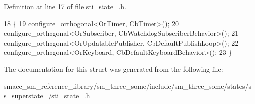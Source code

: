 Definition at line 17 of file sti\+\_\+state\+\_.\+h.


\begin{DoxyCode}
18   \{
19     configure\_orthogonal<OrTimer, CbTimer>();
20     configure\_orthogonal<OrSubscriber, CbWatchdogSubscriberBehavior>();
21     configure\_orthogonal<OrUpdatablePublisher, CbDefaultPublishLoop>();
22     configure\_orthogonal<OrKeyboard, CbDefaultKeyboardBehavior>();
23   \}
\end{DoxyCode}


The documentation for this struct was generated from the following file\+:\begin{DoxyCompactItemize}
\item 
smacc\+\_\+sm\+\_\+reference\+\_\+library/sm\+\_\+three\+\_\+some/include/sm\+\_\+three\+\_\+some/states/ss\+\_\+superstate\+\_/\hyperlink{sti__state__2_8h}{sti\+\_\+state\+\_.\+h}\end{DoxyCompactItemize}
